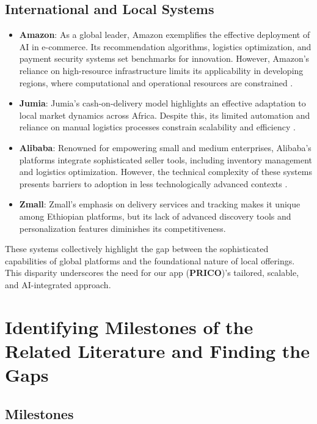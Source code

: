 \documentclass[12pt]{report}
\begin{document}
\subsection*{International and Local Systems}
\begin{itemize}
	\item \textbf{Amazon}: As a global leader, Amazon exemplifies the effective deployment of AI in
	      e-commerce. Its recommendation algorithms, logistics optimization, and payment
	      security systems set benchmarks for innovation. However, Amazon’s reliance on
	      high-resource infrastructure limits its applicability in developing regions, where
	      computational and operational resources are constrained \cite{c16}.
	\item \textbf{Jumia}: Jumia’s cash-on-delivery model highlights an effective adaptation to local
	      market dynamics across Africa. Despite this, its limited automation and reliance on
	      manual logistics processes constrain scalability and efficiency \cite{c18}.
	\item \textbf{Alibaba}: Renowned for empowering small and medium enterprises, Alibaba’s
	      platforms integrate sophisticated seller tools, including inventory management and
	      logistics optimization. However, the technical complexity of these systems presents
	      barriers to adoption in less technologically advanced contexts \cite{c17}.
	\item \textbf{Zmall}: Zmall’s emphasis on delivery services and tracking makes it unique among
	      Ethiopian platforms, but its lack of advanced discovery tools and personalization
	      features diminishes its competitiveness.
\end{itemize}

These systems collectively highlight the gap between the sophisticated capabilities of global
platforms and the foundational nature of local offerings. This disparity underscores the need
for our app (\textbf{PRICO})’s tailored, scalable, and AI-integrated approach.

\section{Identifying Milestones of the Related Literature and Finding the Gaps}

\subsection*{Milestones}
\end{document}
